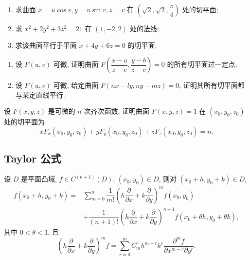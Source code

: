 \documentclass[../../数学分析培优讲义.tex]{subfiles}
\begin{document}
\begin{example}
\begin{enumerate}[label=(\arabic*)]
    \item 求曲面 $x=u\cos v,y=u\sin v,z=v$ 在 $(\sqrt{2},\sqrt{2},\dfrac{\pi}{4})$ 处的切平面;
    \item 求 $x^2+2y^2+3z^2=21$ 在 $(1,-2,2)$ 处的法线;
    \item 求该曲面平行于平面 $x+4y+6z=0$ 的切平面.
\end{enumerate}
\end{example}
\exampleblank

\begin{example}
\begin{enumerate}[label=(\arabic*)]
    \item 设 $F(u,v)$ 可微, 证明曲面 $\displaystyle F\left(\dfrac{x-a}{z-c},\dfrac{y-b}{z-c}\right)=0$ 的所有切平面过一定点;
    \item 设 $F(u,v)$ 可微, 给定曲面 $F(nx-ly,ny-mz)=0$, 证明其所有切平面都与某定直线平行.
\end{enumerate}
\end{example}
\exampleblank

\begin{example}
设 $F(x,y,z)$ 是可微的 $n$ 次齐次函数, 证明曲面 $F(x,y,z)=1$ 在 $(x_0,y_0,z_0)$ 处的切平面为
\[
    xF_x(x_0,y_0,z_0)+yF_y(x_0,y_0,z_0)+zF_z(x_0,y_0,z_0)=n.
\]
\end{example}
\exampleblank



\subsection{Taylor 公式}

\begin{theorem}
设 $D$ 是平面凸域, $f\in C^{(n+1)}(D)$, $(x_0,y_0)\in D$, 则对 $(x_0+h,y_0+k)\in D$,
\[
\begin{aligned}
    f(x_0+h,y_0+k)
    ={}&\sum\limits_{m=0}^n\dfrac{1}{m!}
    \left(h\dfrac{\partial}{\partial x}+k\dfrac{\partial}{\partial y}\right)^m f(x_0,y_0)\\
    &+\dfrac{1}{(n+1)!}
    \left(h\dfrac{\partial}{\partial x}+k\dfrac{\partial}{\partial y}\right)^{n+1}
    f(x_0+\theta h,y_0+\theta k),
\end{aligned}
\]
其中 $0<\theta<1$, 且
\[
    \left(h\dfrac{\partial}{\partial x}+k\dfrac{\partial}{\partial y}\right)^mf
    =\sum\limits_{r=0}^mC_m^r h^{m-r}k^r
    \dfrac{\partial^mf}{\partial x^{m-r}\partial y^r}.
\]
\end{theorem}
\end{document}
